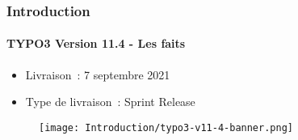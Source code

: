 %

\begin{frame}[fragile]
	\frametitle{Introduction}
	\framesubtitle{TYPO3 Version 11.4 - Les faits}

	\begin{itemize}
		\item Livraison~: 7 septembre 2021
		\item Type de livraison~: Sprint Release
	\end{itemize}

	\begin{figure}
		\texttt{[image: Introduction/typo3-v11-4-banner.png]}
	\end{figure}

\end{frame}


